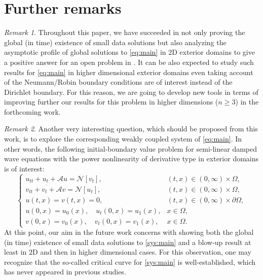 \documentclass[a4paper,11pt]{article} %
\theoremstyle{remark}
\newtheorem{remark}{Remark}[section]
\theoremstyle{definition}
\numberwithin{equation}{section}
\begin{document}
\section{Further remarks} \label{Sec.Final}
\begin{remark}
    Throughout this paper, we have succeeded in not only proving the global (in time) existence of small data solutions but also analyzing the asymptotic profile of global solutions to \eqref{eq:main} in $2$D exterior domains to give a positive answer for an open problem in \cite{DuongDao}. It can be also expected to study such results for \eqref{eq:main} in higher dimensional exterior domains even taking account of the Neumann/Robin boundary conditions are of interest instead of the Dirichlet boundary. For this reason, we are going to develop new tools in terms of improving further our results for this problem in higher dimensions ($n\ge 3$) in the forthcoming work.
\end{remark}

\begin{remark}
    Another very interesting question, which should be proposed from this work, is to explore the corresponding weakly coupled system of \eqref{eq:main}. In other words, the following initial-boundary value problem for semi-linear damped wave equations with the power nonlinearity of derivative type in exterior domains is of interest:
    \begin{equation}\label{sys:main}
    \begin{cases}
        u_{tt}+u_t+ \mathcal{A}u= \mathcal{N}[v_t], & (t,x)\in(0,\infty)\times\Omega,\\
        v_{tt}+v_t+ \mathcal{A}v= \mathcal{N}[u_t], & (t,x)\in(0,\infty)\times\Omega,\\
        u(t,x)=v(t,x)=0, &(t,x)\in(0,\infty)\times \partial\Omega, \\
        u(0,x)=u_0(x),\quad u_t(0,x)=u_1(x), & x\in \Omega, \\
        v(0,x)=v_0(x),\quad v_t(0,x)=v_1(x), & x\in \Omega.
    \end{cases}
    \end{equation}
    At this point, our aim in the future work concerns with showing both the global (in time) existence of small data solutions to \eqref{sys:main} and a blow-up result at least in $2$D and then in higher dimensional cases. For this observation, one may recognize that the so-called critical curve for \eqref{sys:main} is well-established, which has never appeared in previous studies.
\end{remark}
\end{document}
